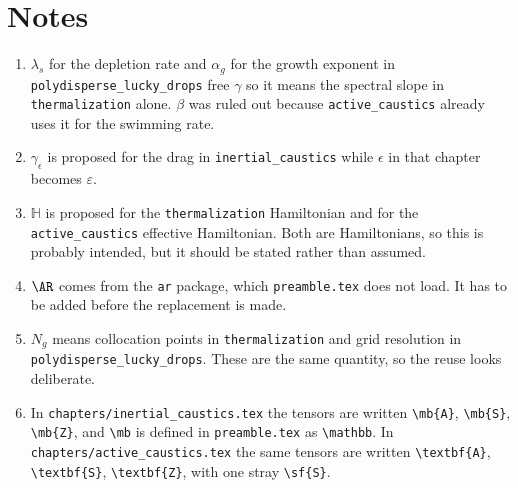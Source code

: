 \documentclass[11pt,a4paper]{article}
\newcommand{\mb}[1]{\mathbb{#1}}
\begin{document}
\endgroup

\section*{Notes}

\begin{enumerate}
  \item $\lambda_s$ for the depletion rate and $\alpha_g$ for the growth exponent in \texttt{polydisperse\_lucky\_drops} free $\gamma$ so it means the spectral slope in \texttt{thermalization} alone. $\beta$ was ruled out because \texttt{active\_caustics} already uses it for the swimming rate.
  \item $\gamma_\epsilon$ is proposed for the drag in \texttt{inertial\_caustics} while $\epsilon$ in that chapter becomes $\varepsilon$.
  \item $\mb{H}$ is proposed for the \texttt{thermalization} Hamiltonian and for the \texttt{active\_caustics} effective Hamiltonian. Both are Hamiltonians, so this is probably intended, but it should be stated rather than assumed.
  \item $\AR$ comes from the \texttt{ar} package, which \texttt{preamble.tex} does not load. It has to be added before the replacement is made.
  \item $N_g$ means collocation points in \texttt{thermalization} and grid resolution in \texttt{polydisperse\_lucky\_drops}. These are the same quantity, so the reuse looks deliberate.
  \item In \texttt{chapters/inertial\_caustics.tex} the tensors are written \verb|\mb{A}|, \verb|\mb{S}|, \verb|\mb{Z}|, and \verb|\mb| is defined in \texttt{preamble.tex} as \verb|\mathbb|. In \texttt{chapters/active\_caustics.tex} the same tensors are written \verb|\textbf{A}|, \verb|\textbf{S}|, \verb|\textbf{Z}|, with one stray \verb|\sf{S}|.
\end{enumerate}
\end{document}
